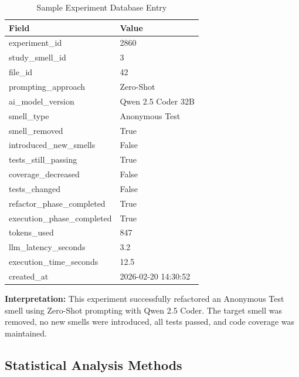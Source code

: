 \begin{table}[h]
\centering
\caption{Sample Experiment Database Entry}
\label{tab:example-experiment}
\scriptsize
\begin{tabular}{@{}ll@{}}
\toprule
\textbf{Field} & \textbf{Value} \\ \midrule
experiment\_id & 2860 \\
study\_smell\_id & 3 \\
file\_id & 42 \\
prompting\_approach & Zero-Shot \\
ai\_model\_version & Qwen 2.5 Coder 32B \\
smell\_type & Anonymous Test \\
smell\_removed & True \\
introduced\_new\_smells & False \\
tests\_still\_passing & True \\
coverage\_decreased & False \\
tests\_changed & False \\
refactor\_phase\_completed & True \\
execution\_phase\_completed & True \\
tokens\_used & 847 \\
llm\_latency\_seconds & 3.2 \\
execution\_time\_seconds & 12.5 \\
created\_at & 2026-02-20 14:30:52 \\ \bottomrule
\end{tabular}
\end{table}

\textbf{Interpretation:} This experiment successfully refactored an Anonymous Test smell using Zero-Shot prompting with Qwen 2.5 Coder. The target smell was removed, no new smells were introduced, all tests passed, and code coverage was maintained.

\subsection{Statistical Analysis Methods}

